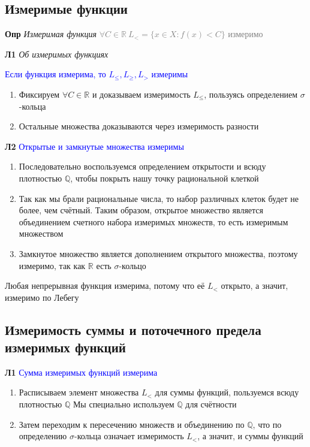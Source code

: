 \subsection{Измеримые функции}

\textbf{Опр} \textit{Измеримая функция} \textcolor{gray}{$\forall C \in \mathbb{R}~L_< = \{ x \in X: f(x) < C \}$
    измеримо}

\textbf{Л1} \textit{Об измеримых функциях}

\textcolor{blue}{Если функция измерима, то $L_{\leq}, L_{\geq}, L_>$ измеримы}

\begin{enumerate}
    \item Фиксируем $\forall C \in \mathbb{R}$ и доказываем измеримость $L_{\leq}$, пользуясь определением $\sigma$-кольца
    \item Остальные множества доказываются через измеримость разности
\end{enumerate}

\textbf{Л2} \textcolor{blue}{Открытые и замкнутые множества измеримы}

\begin{enumerate}
    \item Последовательно воспользуемся определением открытости и всюду плотностью $\mathbb{Q}$, чтобы покрыть нашу
    точку рациональной клеткой
    \item Так как мы брали рациональные числа, то набор различных клеток будет не более, чем счётный.
    Таким образом, открытое множество является объединением счетного набора измеримых множеств, то есть измеримым
    множеством
    \item Замкнутое множество является дополнением открытого множества, поэтому измеримо, так как $\mathbb{R}$ есть
    $\sigma$-кольцо
\end{enumerate}

Любая непрерывная функция измерима, потому что её $L_<$ открыто, а значит, измеримо по Лебегу

\subsection{Измеримость суммы и поточечного предела измеримых функций}

\textbf{Л1} \textcolor{blue}{Сумма измеримых функций измерима}

\begin{enumerate}
    \item Расписываем элемент множества $L_<$ для суммы функций, пользуемся всюду плотностью $\mathbb{Q}$
    Мы специально используем $\mathbb{Q}$ для счётности
    \item Затем переходим к пересечению множеств и объединению по $\mathbb{Q}$, что по определению $\sigma$-кольца означает
    измеримость $L_<$, а значит, и суммы функций
\end{enumerate}

